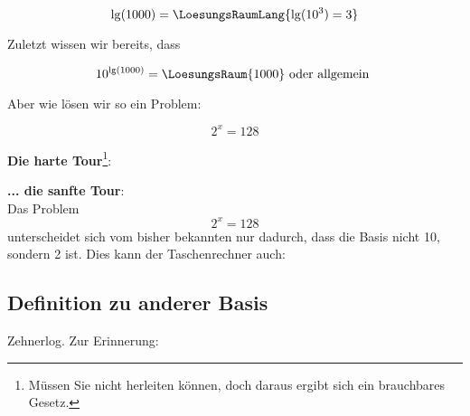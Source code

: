 $$\lg(1000) = \LoesungsRaumLang{\lg(10^3) = 3}$$

Zuletzt wissen wir bereits, dass

$$10^{\lg(1000)} = \LoesungsRaum{1000} \text{ oder allgemein }$$

\newpage


Aber wie lösen wir so ein Problem:

$$2^x = 128$$

\textbf{Die harte Tour}\label{harteTourLogarithmen}\footnote{Müssen Sie nicht herleiten können,
  doch daraus ergibt sich ein brauchbares Gesetz.}:\\


  \textbf{... die sanfte Tour}:\\

 Das Problem $$2^x=128$$ unterscheidet sich vom bisher bekannten nur
 dadurch, dass die Basis nicht 10, sondern 2 ist. Dies kann der
 Taschenrechner auch: 



\subsection{Definition zu anderer Basis}
 
\begin{bemerkung}{Zehnerlog.}{}
  Zur Erinnerung:
  \noTRAINER{\vspace{22mm}}
    
\end{bemerkung}

